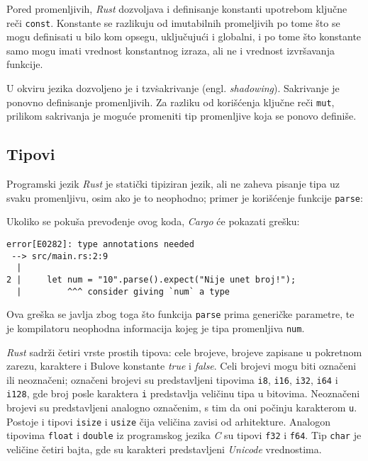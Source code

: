 \documentclass[12pt,oneside]{memoir}
\begin{document}
Pored promenljivih, \emph{Rust} dozvoljava i definisanje konstanti
upotrebom ključne reči \texttt{const}.
Konstante se razlikuju od imutabilnih promeljivih po tome što se 
mogu definisati u bilo kom opsegu, uključujući i globalni, i po 
tome što konstante samo mogu imati vrednost konstantnog izraza, 
ali ne i vrednost izvršavanja funkcije.

U okviru jezika dozvoljeno je i tzv\. sakrivanje (engl. \emph{shadowing}).
Sakrivanje je ponovno definisanje promenljivih. Za razliku od
korišćenja ključne reči \texttt{mut}, prilikom sakrivanja je
moguće promeniti tip promenljive koja se ponovo definiše.

\subsection{Tipovi}
Programski jezik \emph{Rust} je statički tipiziran jezik, ali
ne zaheva pisanje tipa uz svaku promenljivu, osim ako je to
neophodno; primer je korišćenje funkcije \texttt{parse}:



\noindent
Ukoliko se pokuša prevođenje ovog koda, \emph{Cargo} će
pokazati grešku:

\begin{lstlisting}[language={}, style=text]
error[E0282]: type annotations needed
 --> src/main.rs:2:9
  |
2 |     let num = "10".parse().expect("Nije unet broj!");
  |         ^^^ consider giving `num` a type
\end{lstlisting}

\noindent
Ova greška se javlja zbog toga što funkcija \texttt{parse}
prima generičke parametre, te je kompilatoru neophodna informacija
kojeg je tipa promenljiva \texttt{num}.

\emph{Rust} sadrži četiri vrste prostih tipova: cele brojeve,
brojeve zapisane u pokretnom zarezu, karaktere i Bulove
konstante \emph{true} i \emph{false}. Celi brojevi mogu biti
označeni ili neoznačeni; označeni brojevi su predstavljeni
tipovima \texttt{i8}, \texttt{i16}, \texttt{i32}, \texttt{i64} i
\texttt{i128}, gde broj posle karaktera \texttt{i} predstavlja
veličinu tipa u bitovima. Neoznačeni brojevi su predstavljeni
analogno označenim, s tim da oni počinju karakterom \texttt{u}.
Postoje i tipovi \texttt{isize} i \texttt{usize} čija veličina
zavisi od arhitekture.
Analogon tipovima \texttt{float} i \texttt{double} iz programskog
jezika \emph{C} su tipovi \texttt{f32} i \texttt{f64}. Tip
\texttt{char} je veličine četiri bajta, gde su karakteri predstavljeni
\emph{Unicode} vrednostima.
\end{document}
